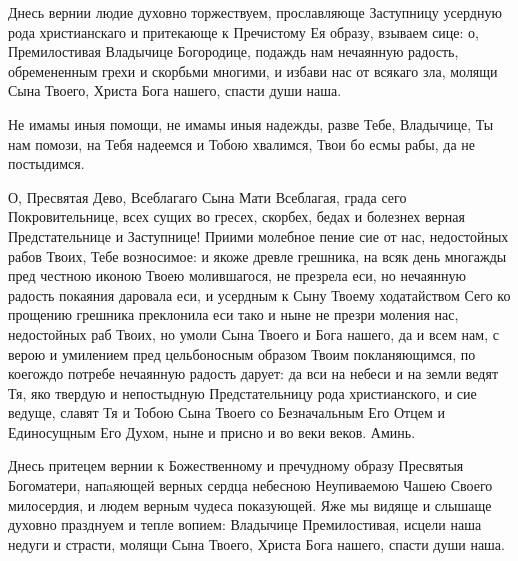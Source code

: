  




Днесь вернии людие духовно торжествуем, прославляюще Заступницу усердную рода христианскаго и притекающе к Пречистому Ея образу, взываем сице: о, Премилостивая Владычице Богородице, подаждь нам нечаянную радость, обремененным грехи и скорбьми многими, и избави нас от всякаго зла, молящи Сына Твоего, Христа Бога нашего, спасти души наша.




Не имамы иныя помощи, не имамы иныя надежды, разве Тебе, Владычице, Ты нам помози, на Тебя надеемся и Тобою хвалимся, Твои бо есмы рабы, да не постыдимся.




О, Пресвятая Дево, Всеблагаго Сына Мати Всеблагая, града сего Покровительнице, всех сущих во гресех, скорбех, бедах и болезнех верная Предстательнице и Заступнице! Приими молебное пение сие от нас, недостойных рабов Твоих, Тебе возносимое: и якоже древле грешника, на всяк день многажды пред честною иконою Твоею молившагося, не презрела еси, но нечаянную радость покаяния даровала еси, и усердным к Сыну Твоему ходатайством Сего ко прощению грешника преклонила еси тако и ныне не презри моления нас, недостойных раб Твоих, но умоли Сына Твоего и Бога нашего, да и всем нам, с верою и умилением пред цельбоносным образом Твоим покланяющимся, по коегождо потребе нечаянную радость дарует: да вси на небеси и на земли ведят Тя, яко твердую и непостыдную Предстательницу рода христианского, и сие ведуще, славят Тя и Тобою Сына Твоего со Безначальным Его Отцем и Единосущным Его Духом, ныне и присно и во веки веков. Аминь.
\mychapterending

 



Днесь притецем вернии к Божественному и пречудному образу Пресвятыя Богоматери, напaяющей верных сердца небесною Неупиваемою Чашею Своего милосердия, и людем верным чудеса показующей. Яже мы видяще и слышаще духовно празднуем и тепле вопием: Владычице Премилостивая, исцели наша недуги и страсти, молящи Сына Твоего, Христа Бога нашего, спасти души наша.


